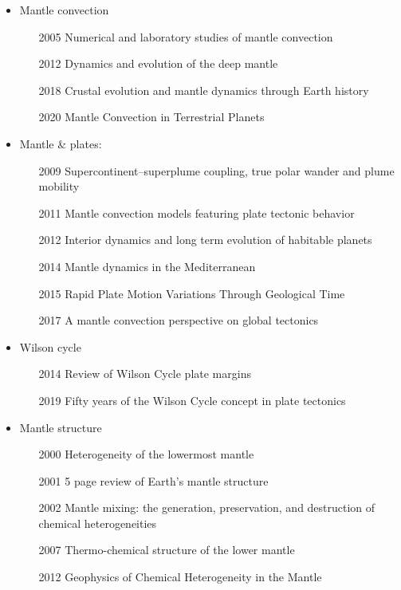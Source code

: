 \begin{itemize}
\item Mantle convection 

   \begin{itemize}
   \item [2005] Numerical and laboratory studies of mantle convection \cite{taxn05}
   \item [2012] Dynamics and evolution of the deep mantle  \cite{tack12}
   \item [2018] Crustal evolution and mantle dynamics through Earth history \cite{kore18}
   \item [2020] Mantle Convection in Terrestrial Planets \cite{mube20}
   \end{itemize}

\item Mantle \& plates:
   \begin{itemize}
   \item [2009] Supercontinent–superplume coupling, true polar wander and plume mobility \cite{lizh09}
   \item [2011] Mantle convection models featuring plate tectonic behavior \cite{lowm11}
   \item [2012] Interior dynamics and long term evolution of habitable planets \cite{taab12}
   \item [2014] Mantle dynamics in the Mediterranean \cite{faba14}
   \item [2015] Rapid Plate Motion Variations Through Geological Time \cite{iabu15}
   \item [2017] A mantle convection perspective on global tectonics \cite{cogu17}
   \end{itemize}

\item Wilson cycle
   \begin{itemize}
   \item [2014] Review of Wilson Cycle plate margins \cite{buto14}
   \item [2019] Fifty years of the Wilson Cycle concept in plate tectonics \cite{wihb19}
   \end{itemize}

\item Mantle structure
   \begin{itemize}
   \item [2000] Heterogeneity of the lowermost mantle \cite{garn00}
   \item [2001] 5 page review of Earth's mantle structure \cite{hewo01}
   \item [2002] Mantle mixing: the generation, preservation, and destruction of chemical heterogeneities \cite{vahb02}
   \item [2007] Thermo-chemical structure of the lower mantle \cite{dett07}
   \item [2012] Geophysics of Chemical Heterogeneity in the Mantle \cite{stli12}
   \end{itemize}


\end{itemize}
